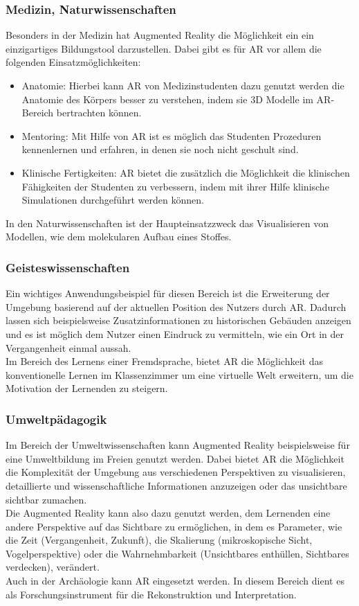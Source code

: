 \subsubsection{Medizin, Naturwissenschaften}
Besonders in der Medizin hat Augmented Reality die Möglichkeit ein ein einzigartiges Bildungstool darzustellen. Dabei gibt es für AR vor allem die folgenden Einsatzmöglichkeiten:
\begin{itemize}
\item Anatomie: Hierbei kann AR von Medizinstudenten dazu genutzt werden die Anatomie des Körpers besser zu verstehen, indem sie 3D Modelle im AR-Bereich bertrachten können.
\item Mentoring: Mit Hilfe von AR ist es möglich das Studenten Prozeduren kennenlernen und erfahren, in denen sie noch nicht geschult sind. 
\item Klinische Fertigkeiten: AR bietet die zusätzlich die Möglichkeit die klinischen Fähigkeiten der Studenten zu verbessern, indem mit ihrer Hilfe klinische Simulationen durchgeführt werden können.
\end{itemize}
In den Naturwissenschaften ist der Haupteinsatzzweck das Visualisieren von Modellen, wie dem molekularen Aufbau eines Stoffes.

\subsubsection{Geisteswissenschaften}
Ein wichtiges Anwendungsbeispiel für diesen Bereich ist die Erweiterung der Umgebung basierend auf der aktuellen Position des Nutzers  durch AR. Dadurch lassen sich beispielsweise Zusatzinformationen zu historischen Gebäuden anzeigen und es ist möglich dem Nutzer einen Eindruck zu vermitteln, wie ein Ort in der Vergangenheit einmal aussah. \\
Im Bereich des Lernens einer Fremdsprache, bietet AR die Möglichkeit das konventionelle Lernen im Klassenzimmer um eine virtuelle Welt erweitern, um die Motivation der Lernenden zu steigern.

\subsubsection{Umweltpädagogik}
Im Bereich der Umweltwissenschaften kann Augmented Reality beispielsweise für eine Umweltbildung im Freien genutzt werden. Dabei bietet AR die Möglichkeit die Komplexität der Umgebung aus verschiedenen Perspektiven zu visualisieren, detaillierte und wissenschaftliche Informationen anzuzeigen oder das \glqq unsichtbare\grqq{} sichtbar zumachen. \\
Die Augmented Reality kann also dazu genutzt werden, dem Lernenden eine andere Perspektive auf das Sichtbare zu ermöglichen, in dem es Parameter, wie die Zeit (Vergangenheit, Zukunft), die Skalierung (mikroskopische Sicht, Vogelperspektive) oder die Wahrnehmbarkeit (Unsichtbares enthüllen, Sichtbares verdecken), verändert.\\
Auch in der Archäologie kann AR eingesetzt werden. In diesem Bereich dient es als Forschungsinstrument für die Rekonstruktion und Interpretation.

